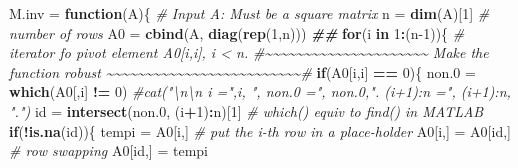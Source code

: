 \documentclass[
]{book}
\newenvironment{Shaded}{\begin{snugshade}}{\end{snugshade}}
\newcommand{\CommentTok}[1]{\textcolor[rgb]{0.56,0.35,0.01}{\textit{#1}}}
\newcommand{\ControlFlowTok}[1]{\textcolor[rgb]{0.13,0.29,0.53}{\textbf{#1}}}
\newcommand{\DecValTok}[1]{\textcolor[rgb]{0.00,0.00,0.81}{#1}}
\newcommand{\DocumentationTok}[1]{\textcolor[rgb]{0.56,0.35,0.01}{\textbf{\textit{#1}}}}
\newcommand{\FloatTok}[1]{\textcolor[rgb]{0.00,0.00,0.81}{#1}}
\newcommand{\FunctionTok}[1]{\textcolor[rgb]{0.13,0.29,0.53}{\textbf{#1}}}
\newcommand{\NormalTok}[1]{#1}
\newcommand{\OtherTok}[1]{\textcolor[rgb]{0.56,0.35,0.01}{#1}}
\newcommand{\SpecialCharTok}[1]{\textcolor[rgb]{0.81,0.36,0.00}{\textbf{#1}}}
\begin{document}
\begin{Shaded}
\begin{Highlighting}[]
\NormalTok{M.inv }\OtherTok{=} \ControlFlowTok{function}\NormalTok{(A)\{}
  \CommentTok{\# Input A: Must be a square matrix}
\NormalTok{  n }\OtherTok{=} \FunctionTok{dim}\NormalTok{(A)[}\DecValTok{1}\NormalTok{]                }\CommentTok{\# number of rows}
\NormalTok{  A0 }\OtherTok{=} \FunctionTok{cbind}\NormalTok{(A, }\FunctionTok{diag}\NormalTok{(}\FunctionTok{rep}\NormalTok{(}\DecValTok{1}\NormalTok{,n)))        }
  \DocumentationTok{\#\#}
  \ControlFlowTok{for}\NormalTok{(i }\ControlFlowTok{in} \DecValTok{1}\SpecialCharTok{:}\NormalTok{(n}\DecValTok{{-}1}\NormalTok{))\{   }\CommentTok{\# iterator fo pivot element A0[i,i], i \textless{} n.}
      \CommentTok{\#\textasciitilde{}\textasciitilde{}\textasciitilde{}\textasciitilde{}\textasciitilde{}\textasciitilde{}\textasciitilde{}\textasciitilde{}\textasciitilde{}\textasciitilde{}\textasciitilde{}\textasciitilde{}\textasciitilde{}\textasciitilde{}\textasciitilde{}\textasciitilde{}\textasciitilde{}\textasciitilde{}\textasciitilde{}\textasciitilde{}\textasciitilde{}   Make the function robust  \textasciitilde{}\textasciitilde{}\textasciitilde{}\textasciitilde{}\textasciitilde{}\textasciitilde{}\textasciitilde{}\textasciitilde{}\textasciitilde{}\textasciitilde{}\textasciitilde{}\textasciitilde{}\textasciitilde{}\textasciitilde{}\textasciitilde{}\textasciitilde{}\textasciitilde{}\textasciitilde{}\textasciitilde{}\textasciitilde{}\textasciitilde{}\textasciitilde{}\textasciitilde{}\textasciitilde{}\textasciitilde{}\#}
      \ControlFlowTok{if}\NormalTok{(A0[i,i] }\SpecialCharTok{==} \DecValTok{0}\NormalTok{)\{}
\NormalTok{          non}\FloatTok{.0} \OtherTok{=} \FunctionTok{which}\NormalTok{(A0[,i] }\SpecialCharTok{!=} \DecValTok{0}\NormalTok{)}
              \CommentTok{\#cat("\textbackslash{}n\textbackslash{}n i =",i, ", non.0 =", non.0,". (i+1):n =", (i+1):n, ".")}
\NormalTok{              id }\OtherTok{=} \FunctionTok{intersect}\NormalTok{(non}\FloatTok{.0}\NormalTok{, (i}\SpecialCharTok{+}\DecValTok{1}\NormalTok{)}\SpecialCharTok{:}\NormalTok{n)[}\DecValTok{1}\NormalTok{] }\CommentTok{\# which() equiv to find() in MATLAB}
              \ControlFlowTok{if}\NormalTok{(}\SpecialCharTok{!}\FunctionTok{is.na}\NormalTok{(id))\{}
\NormalTok{              tempi }\OtherTok{=}\NormalTok{ A0[i,]                    }\CommentTok{\# put the i{-}th row in a place{-}holder}
\NormalTok{              A0[i,] }\OtherTok{=}\NormalTok{ A0[id,]                  }\CommentTok{\# row swapping}
\NormalTok{              A0[id,] }\OtherTok{=}\NormalTok{ tempi    }

\end{Highlighting}
\end{Shaded}
\end{document}
